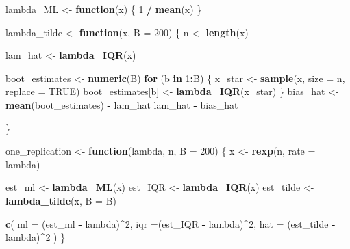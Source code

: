 \documentclass[
]{article}
\newenvironment{Shaded}{\begin{snugshade}}{\end{snugshade}}
\newcommand{\AttributeTok}[1]{\textcolor[rgb]{0.13,0.29,0.53}{#1}}
\newcommand{\ConstantTok}[1]{\textcolor[rgb]{0.56,0.35,0.01}{#1}}
\newcommand{\ControlFlowTok}[1]{\textcolor[rgb]{0.13,0.29,0.53}{\textbf{#1}}}
\newcommand{\DecValTok}[1]{\textcolor[rgb]{0.00,0.00,0.81}{#1}}
\newcommand{\FunctionTok}[1]{\textcolor[rgb]{0.13,0.29,0.53}{\textbf{#1}}}
\newcommand{\NormalTok}[1]{#1}
\newcommand{\OtherTok}[1]{\textcolor[rgb]{0.56,0.35,0.01}{#1}}
\newcommand{\SpecialCharTok}[1]{\textcolor[rgb]{0.81,0.36,0.00}{\textbf{#1}}}
\begin{document}
\begin{Shaded}
\begin{Highlighting}[]
\NormalTok{lambda\_ML }\OtherTok{\textless{}{-}} \ControlFlowTok{function}\NormalTok{(x) \{}
  \DecValTok{1} \SpecialCharTok{/} \FunctionTok{mean}\NormalTok{(x)}
\NormalTok{\}}

\NormalTok{lambda\_tilde }\OtherTok{\textless{}{-}} \ControlFlowTok{function}\NormalTok{(x, }\AttributeTok{B =} \DecValTok{200}\NormalTok{) \{}
\NormalTok{  n }\OtherTok{\textless{}{-}} \FunctionTok{length}\NormalTok{(x)}
  
\NormalTok{  lam\_hat }\OtherTok{\textless{}{-}} \FunctionTok{lambda\_IQR}\NormalTok{(x)}
  
\NormalTok{  boot\_estimates }\OtherTok{\textless{}{-}} \FunctionTok{numeric}\NormalTok{(B)}
  \ControlFlowTok{for}\NormalTok{ (b }\ControlFlowTok{in} \DecValTok{1}\SpecialCharTok{:}\NormalTok{B) \{}
\NormalTok{    x\_star }\OtherTok{\textless{}{-}} \FunctionTok{sample}\NormalTok{(x, }\AttributeTok{size =}\NormalTok{ n, }\AttributeTok{replace =} \ConstantTok{TRUE}\NormalTok{)}
\NormalTok{    boot\_estimates[b] }\OtherTok{\textless{}{-}} \FunctionTok{lambda\_IQR}\NormalTok{(x\_star)}
\NormalTok{  \}}
\NormalTok{  bias\_hat }\OtherTok{\textless{}{-}} \FunctionTok{mean}\NormalTok{(boot\_estimates) }\SpecialCharTok{{-}}\NormalTok{ lam\_hat}
\NormalTok{  lam\_hat }\SpecialCharTok{{-}}\NormalTok{ bias\_hat}

\NormalTok{  \}}

\NormalTok{one\_replication }\OtherTok{\textless{}{-}} \ControlFlowTok{function}\NormalTok{(lambda, n, }\AttributeTok{B =} \DecValTok{200}\NormalTok{) \{}
\NormalTok{  x }\OtherTok{\textless{}{-}} \FunctionTok{rexp}\NormalTok{(n, }\AttributeTok{rate =}\NormalTok{ lambda)}
  
\NormalTok{  est\_ml }\OtherTok{\textless{}{-}} \FunctionTok{lambda\_ML}\NormalTok{(x)}
\NormalTok{  est\_IQR }\OtherTok{\textless{}{-}} \FunctionTok{lambda\_IQR}\NormalTok{(x)}
\NormalTok{  est\_tilde }\OtherTok{\textless{}{-}} \FunctionTok{lambda\_tilde}\NormalTok{(x, }\AttributeTok{B =}\NormalTok{ B)}

  \FunctionTok{c}\NormalTok{(}
    \AttributeTok{ml =}\NormalTok{ (est\_ml }\SpecialCharTok{{-}}\NormalTok{ lambda)}\SpecialCharTok{\^{}}\DecValTok{2}\NormalTok{,}
    \AttributeTok{iqr =}\NormalTok{(est\_IQR }\SpecialCharTok{{-}}\NormalTok{ lambda)}\SpecialCharTok{\^{}}\DecValTok{2}\NormalTok{,}
    \AttributeTok{hat =}\NormalTok{ (est\_tilde }\SpecialCharTok{{-}}\NormalTok{ lambda)}\SpecialCharTok{\^{}}\DecValTok{2}
\NormalTok{  )}
\NormalTok{\}}
\end{Highlighting}
\end{Shaded}
\end{document}
